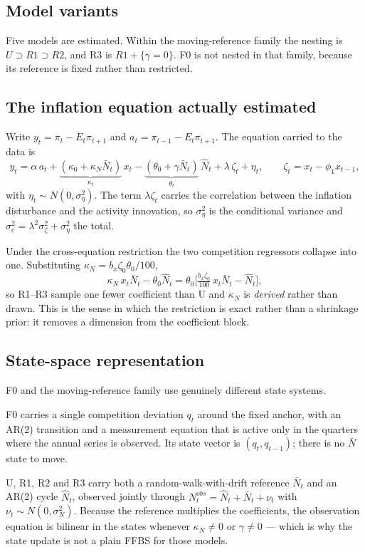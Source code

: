 \documentclass[11pt]{article}
\newcommand{\kt}{\kappa_t}
\newcommand{\Nbar}{\bar N}
\newcommand{\Nhat}{\hat N}
\begin{document}
\subsection{Model variants}
Five models are estimated. Within the moving-reference family the nesting is
$U\supset R1\supset R2$, and R3 is $R1+\{\gamma=0\}$. F0 is not nested in that
family, because its reference is fixed rather than restricted.

\par\medskip


\subsection{The inflation equation actually estimated}
Write $y_t=\pi_t-E_t\pi_{t+1}$ and $a_t=\pi_{t-1}-E_t\pi_{t+1}$. The equation
carried to the data is
\[
  y_t=\alpha\,a_t
      +\underbrace{(\kappa_0+\kappa_N\Nbar_t)}_{\kt}\,x_t
      -\underbrace{(\theta_0+\gamma\Nbar_t)}_{\theta_t}\,\Nhat_t
      +\lambda\,\zeta_t+\eta_t,
  \qquad \zeta_t=x_t-\phi_1x_{t-1},
\]
with $\eta_t\sim N(0,\sigma_\eta^2)$. The term $\lambda\zeta_t$ carries the
correlation between the inflation disturbance and the activity innovation, so
$\sigma_\eta^2$ is the conditional variance and $\sigma_e^2=\lambda^2
\sigma_\zeta^2+\sigma_\eta^2$ the total.

Under the cross-equation restriction the two competition regressors collapse
into one. Substituting $\kappa_N=b_x\zeta_0\theta_0/100$,
\[
  \kappa_N\,x_t\Nbar_t-\theta_0\Nhat_t
  =\theta_0\Big[\tfrac{b_x\zeta_0}{100}\,x_t\Nbar_t-\Nhat_t\Big],
\]
so R1--R3 sample one fewer coefficient than U and $\kappa_N$ is \emph{derived}
rather than drawn. This is the sense in which the restriction is exact rather
than a shrinkage prior: it removes a dimension from the coefficient block.

\subsection{State-space representation}
F0 and the moving-reference family use genuinely different state systems.

F0 carries a single competition deviation $q_t$ around the fixed anchor, with an
AR(2) transition and a measurement equation that is active only in the quarters
where the annual series is observed. Its state vector is $(q_t,q_{t-1})$; there
is no $\Nbar$ state to move.

U, R1, R2 and R3 carry both a random-walk-with-drift reference $\Nbar_t$ and an
AR(2) cycle $\Nhat_t$, observed jointly through
$N^{obs}_t=\Nhat_t+\Nbar_t+\nu_t$ with $\nu_t\sim N(0,\sigma_N^2)$. Because the
reference multiplies the coefficients, the observation equation is bilinear in
the states whenever $\kappa_N\neq0$ or $\gamma\neq0$ --- which is why the state
update is not a plain FFBS for those models.
\end{document}
